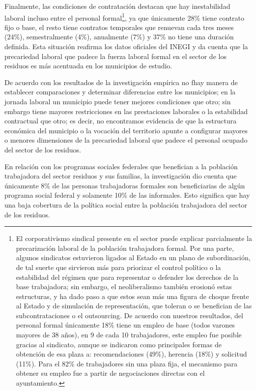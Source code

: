 \documentclass[
  spanish,
  11.5pt,
  170mm x 240mmpaper,
]{scrbook}
\begin{document}
Finalmente, las condiciones de contratación destacan que hay
inestabilidad laboral incluso entre el personal formal\footnote{El
  corporativismo sindical presente en el sector puede explicar
  parcialmente la precarización laboral de la población trabajadora
  formal. Por una parte, algunos sindicatos estuvieron ligados al Estado
  en un plano de subordinación, de tal suerte que sirvieron más para
  priorizar el control político o la estabilidad del régimen que para
  representar o defender los derechos de la base trabajadora; sin
  embargo, el neoliberalismo también erosionó estas estructuras, y ha
  dado paso a que estos sean más una figura de choque frente al Estado y
  de simulación de representación, que toleran o se benefician de las
  subcontrataciones o el outsourcing. De acuerdo con nuestros
  resultados, del personal formal únicamente 18\% tiene un empleo de
  base (todos varones mayores de 38 años), en 9 de cada 10 trabajadores,
  este empleo fue posible gracias al sindicato, aunque se indicaron como
  principales formas de obtención de esa plaza a: recomendaciones
  (49\%), herencia (18\%) y solicitud (11\%). Para el 82\% de
  trabajadores sin una plaza fija, el mecanismo para obtener su empleo
  fue a partir de negociaciones directas con el ayuntamiento.}, ya que
únicamente 28\% tiene contrato fijo o base, el resto tiene contratos
temporales que renuevan cada tres meses (24\%), semestralmente (4\%),
anualmente (7\%) y 37\% no tiene una duración definida. Esta situación
reafirma los datos oficiales del INEGI y da cuenta que la precariedad
laboral que padece la fuerza laboral formal en el sector de los residuos
es más acentuada en los municipios de estudio.

De acuerdo con los resultados de la investigación empírica no fhay
manera de establecer comparaciones y determinar diferencias entre los
municipios; en la jornada laboral un municipio puede tener mejores
condiciones que otro; sin embargo tiene mayores restricciones en las
prestaciones laborales o la estabilidad contractual que otro; es decir,
no encontramos evidencia de que la estructura económica del municipio o
la vocación del territorio apunte a configurar mayores o menores
dimensiones de la precariedad laboral que padece el personal ocupado del
sector de los residuos.

En relación con los programas sociales federales que benefician a la
población trabajadora del sector residuos y sus familias, la
investigación dio cuenta que únicamente 8\% de las personas trabajadoras
formales son beneficiarias de algún programa social federal y solamente
10\% de las informales. Esto significa que hay una baja cobertura de la
política social entre la población trabajadora del sector de los
residuos.
\end{document}
